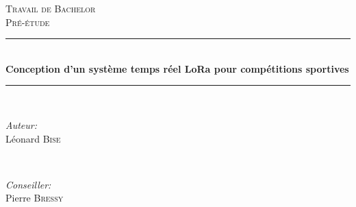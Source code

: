 \begin{titlepage}

\newcommand{\HRule}{\rule{\linewidth}{0.5mm}} %

\center %
 


\vspace{3cm}

\textsc{\Large Travail de Bachelor}\\[0.5cm] %
\textsc{\large Pré-étude}\\[0.5cm] %


\HRule \\[0.4cm]
{ \huge \bfseries Conception d'un système temps réel LoRa pour compétitions sportives}\\[0.4cm] %
\HRule \\[1.5cm]
 

\begin{minipage}{0.4\textwidth}
\begin{flushleft} \large
\emph{Auteur:}\\
Léonard \textsc{Bise} %
\end{flushleft}
\end{minipage}
~
\begin{minipage}{0.4\textwidth}
\begin{flushright} \large
\emph{Conseiller:} \\
Pierre \textsc{Bressy} %
\end{flushright}
\end{minipage}\\[2cm]


\end{titlepage}
